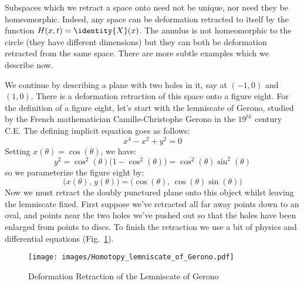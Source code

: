 \documentclass{book}                                                           %
\begin{document}
                Subspaces which we retract a space onto need not be unique, nor
                need they be homeomorphic. Indeed, any space can be deformation
                retracted to itself by the function $H(x,t)=\identity{X}(x)$.
                The annulus is not homeomorphic to the circle (they have
                different dimensions) but they can both be deformation
                retracted from the same space. There are more subtle examples
                which we describe now.
                \par\hfill\par
                We continue by describing a plane with two holes in it,
                say at $(\minus{1},0)$ and $(1,0)$. There is a deformation
                retraction of this space onto a figure eight. For the definition
                of a figure eight, let's start with the lemniscate of Gerono,
                studied by the French mathematician Camille-Christophe Gerono in
                the $19^{th}$ century C.E. The defining implicit equation goes
                as follows:
                \begin{equation}
                    x^{4}-x^{2}+y^{2}=0
                \end{equation}
                Setting $x(\theta)=\cos(\theta)$, we have:
                \begin{equation}
                    y^{2}=\cos^{2}(\theta)\big(1-\cos^{2}(\theta)\big)
                         =\cos^{2}(\theta)\sin^{2}(\theta)
                \end{equation}
                so we parameterize the figure eight by:
                \begin{equation}
                    \big(x(\theta),\,y(\theta)\big)
                        =\big(\cos(\theta),\,\cos(\theta)\sin(\theta)\big)
                \end{equation}
                Now we must retract the doubly punctured plane onto this object
                whilst leaving the lemniscate fixed. First suppose we've
                retracted all far away points down to an oval, and points near
                the two holes we've pushed out so that the holes have been
                enlarged from points to discs. To finish the retraction we use a
                bit of physics and differential equations
                (Fig.~\ref{fig:Deformation_Retraction_lemniscate_of_Gerono}).
                \begin{figure}
                    \centering
                    \captionsetup{type=figure}
                    \texttt{[image: images/Homotopy\_lemniscate\_of\_Gerono.pdf]}
                    \caption{Deformation Retraction of the Lemniscate of Gerono}
                    \label{fig:Deformation_Retraction_lemniscate_of_Gerono}
                \end{figure}
\end{document}

